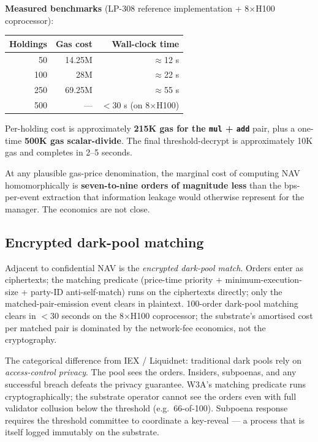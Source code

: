 \textbf{Measured benchmarks} (LP-308 reference implementation +
8$\times$H100 coprocessor):

\begin{center}
\small
\begin{tabular}{rrr}
\toprule
Holdings & Gas cost & Wall-clock time \\
\midrule
50 & 14.25M & $\approx$12 s \\
100 & 28M & $\approx$22 s \\
250 & 69.25M & $\approx$55 s \\
500 & --- & $<$30 s (on 8$\times$H100) \\
\bottomrule
\end{tabular}
\end{center}

Per-holding cost is approximately \textbf{215K gas for the
\texttt{mul} + \texttt{add}} pair, plus a one-time \textbf{500K gas
scalar-divide}. The final threshold-decrypt is approximately 10K gas
and completes in 2--5 seconds.

At any plausible gas-price denomination, the marginal cost of computing
NAV homomorphically is \textbf{seven-to-nine orders of magnitude less}
than the bps-per-event extraction that information leakage would
otherwise represent for the manager. The economics are not close.

\subsection{Encrypted dark-pool matching}

Adjacent to confidential NAV is the \emph{encrypted dark-pool match}.
Orders enter as ciphertexts; the matching predicate (price-time priority
+ minimum-execution-size + party-ID anti-self-match) runs on the
ciphertexts directly; only the matched-pair-emission event clears in
plaintext. 100-order dark-pool matching clears in $<30$ seconds on the
8$\times$H100 coprocessor; the substrate's amortised cost per matched
pair is dominated by the network-fee economics, not the cryptography.

The categorical difference from IEX / Liquidnet: traditional dark pools
rely on \emph{access-control privacy}. The pool sees the orders.
Insiders, subpoenas, and any successful breach defeats the privacy
guarantee. W3A's matching predicate runs cryptographically; the
substrate operator cannot see the orders even with full validator
collusion below the threshold (e.g.\ 66-of-100). Subpoena response
requires the threshold committee to coordinate a key-reveal --- a
process that is itself logged immutably on the substrate.

